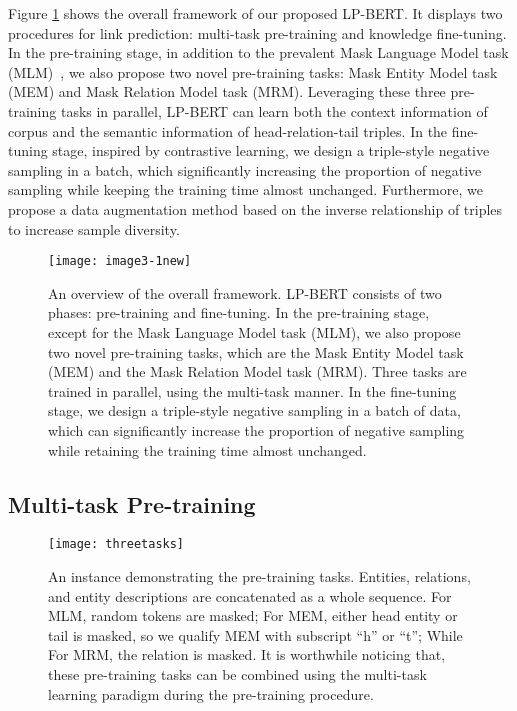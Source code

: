 \documentclass[journal]{IEEEtran}
\begin{document}
Figure \ref{fig:fig1} shows the overall framework of our proposed LP-BERT. It displays two procedures for link prediction: multi-task pre-training and knowledge fine-tuning. In the pre-training stage, in addition to the prevalent Mask Language Model task (MLM)~\cite{devlin2018bert}, we also propose two novel pre-training tasks: Mask Entity Model task (MEM) and Mask Relation Model task (MRM). Leveraging these three pre-training tasks in parallel, LP-BERT can learn both the context information of corpus and the semantic information of head-relation-tail triples.  
In the fine-tuning stage, inspired by contrastive learning, we design a triple-style negative sampling in a batch, which significantly increasing the proportion of negative sampling while keeping the training time almost unchanged. Furthermore, we propose a data augmentation method based on the inverse relationship of triples to increase sample diversity.
\begin{figure}[htb]
\begin{minipage}[b]{1.0\linewidth}
		\centering
		\centerline{\texttt{[image: image3-1new]}}
\end{minipage}
	\caption{An overview of the overall framework. LP-BERT consists of two phases: pre-training and fine-tuning. In the pre-training stage, except for the Mask Language Model task (MLM), we also propose two novel pre-training tasks, which are the Mask Entity Model task (MEM) and the Mask Relation Model task (MRM). Three tasks are trained in parallel, using the multi-task manner. In the fine-tuning stage, we design a triple-style negative sampling in a batch of data, which can significantly increase the proportion of negative sampling while retaining the training time almost unchanged.}
	\label{fig:fig1}
\end{figure}


\subsection{Multi-task Pre-training}

\begin{figure*}[htb]
\begin{minipage}[b]{1.0\linewidth}
		\centering
		\centerline{\texttt{[image: threetasks]}}
		\vspace{-0.3cm}
	\end{minipage}
	\caption{An instance demonstrating the pre-training tasks. Entities, relations, and entity descriptions are concatenated as a whole sequence. For MLM, random tokens are masked; For MEM, either head entity or tail is masked, so we qualify MEM with subscript ``h'' or ``t''; While For MRM, the relation is masked. It is worthwhile noticing that, these pre-training tasks can be combined using the multi-task learning paradigm during the pre-training procedure. 
	}
	\label{fig:fig2}
\end{figure*}
\end{document}
